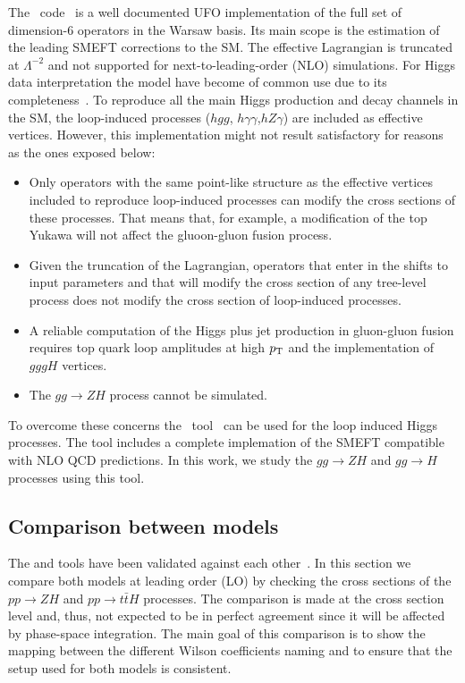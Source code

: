 The \SMEFTsim\ code~\cite{Brivio:2017btx} is a well documented UFO implementation of the full set of dimension-6 operators in the Warsaw basis. Its main scope is the estimation of the leading SMEFT corrections to the SM. The effective Lagrangian is truncated at $\Lambda^{-2}$ and not supported for next-to-leading-order (NLO) simulations. For Higgs data interpretation the model have become of common use due to its completeness~\cite{Ellis:2018gqa,ATLAS:2019jst}.  To reproduce all the main Higgs production and decay channels in the SM, the loop-induced processes ($hgg$, $h\gamma\gamma$,$hZ\gamma$) are included as effective vertices. However, this implementation might not result satisfactory for reasons as the ones exposed below:
\begin{itemize}
\item Only operators with the same point-like structure as the effective vertices included to reproduce loop-induced processes can modify the cross sections of these processes. That means that, for example, a modification of the top Yukawa will not affect the gluoon-gluon fusion process.
\item Given the truncation of the Lagrangian, operators that enter in the shifts to input parameters and that will modify the cross section of any tree-level process does not modify the cross section of loop-induced processes.
\item A reliable computation of the Higgs plus jet  production in gluon-gluon fusion requires top quark loop amplitudes at high $p_{\textrm T}$ and the implementation of $gggH$ vertices.
\item The $gg\to ZH$ process cannot be simulated.
\end{itemize}

To overcome these concerns the \SMEFTatNLO\ tool~\cite{SMEFTNLO} can be used for the loop induced Higgs processes. The tool includes a complete implemation of the SMEFT compatible with NLO QCD predictions. In this work, we study the $gg\to ZH$ and $gg\to H$ processes using this tool. 







\subsection{Comparison between models}
\label{sec:higgseft:section2}
The \SMEFTsim and \SMEFTatNLO tools have been validated against each other~\cite{Durieux:2019lnv}. In this section we compare both models at leading order (LO) by checking the cross sections of the $pp\to ZH$ and $pp\to t\bar{t}H$ processes. The comparison is made at the cross section level and, thus, not expected to be in perfect agreement since it will be affected by phase-space integration. The main goal of this comparison is to show the mapping between the different Wilson coefficients naming and to ensure that the setup used for both models is consistent.

